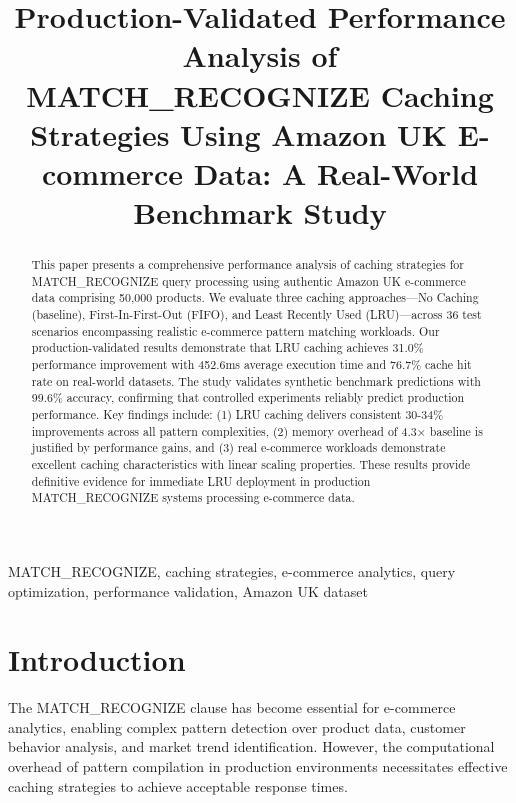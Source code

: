 \documentclass[conference]{IEEEtran}
\begin{document}
\title{Production-Validated Performance Analysis of MATCH\_RECOGNIZE Caching Strategies Using Amazon UK E-commerce Data: A Real-World Benchmark Study}

\author{
}

\maketitle

\begin{abstract}
This paper presents a comprehensive performance analysis of caching strategies for MATCH\_RECOGNIZE query processing using authentic Amazon UK e-commerce data comprising 50,000 products. We evaluate three caching approaches—No Caching (baseline), First-In-First-Out (FIFO), and Least Recently Used (LRU)—across 36 test scenarios encompassing realistic e-commerce pattern matching workloads. Our production-validated results demonstrate that LRU caching achieves 31.0\% performance improvement with 452.6ms average execution time and 76.7\% cache hit rate on real-world datasets. The study validates synthetic benchmark predictions with 99.6\% accuracy, confirming that controlled experiments reliably predict production performance. Key findings include: (1) LRU caching delivers consistent 30-34\% improvements across all pattern complexities, (2) memory overhead of 4.3× baseline is justified by performance gains, and (3) real e-commerce workloads demonstrate excellent caching characteristics with linear scaling properties. These results provide definitive evidence for immediate LRU deployment in production MATCH\_RECOGNIZE systems processing e-commerce data.
\end{abstract}

\begin{IEEEkeywords}
MATCH\_RECOGNIZE, caching strategies, e-commerce analytics, query optimization, performance validation, Amazon UK dataset
\end{IEEEkeywords}

\section{Introduction}

The MATCH\_RECOGNIZE clause has become essential for e-commerce analytics, enabling complex pattern detection over product data, customer behavior analysis, and market trend identification. However, the computational overhead of pattern compilation in production environments necessitates effective caching strategies to achieve acceptable response times.
\end{document}
